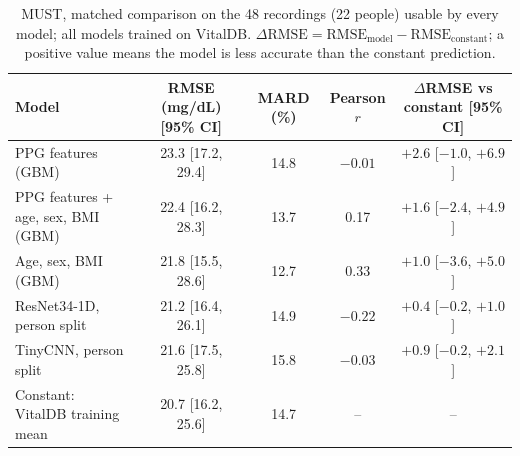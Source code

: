 \documentclass[10pt]{article}
\newcommand{\mgdl}{mg/dL}
\begin{document}
\begin{table}[H]
\centering\footnotesize\setlength{\tabcolsep}{3.5pt}
\caption{MUST, matched comparison on the 48 recordings (22 people) usable by every model; all models trained on VitalDB. $\Delta\mathrm{RMSE}=\mathrm{RMSE}_{\mathrm{model}}-\mathrm{RMSE}_{\mathrm{constant}}$; a positive value means the model is less accurate than the constant prediction.}
\label{tab:must_matched}
\begin{tabular}{@{}lcccc@{}}
\toprule
Model & RMSE (\mgdl{}) [95\% CI] & MARD (\%) & Pearson $r$ & $\Delta$RMSE vs constant [95\% CI] \\
\midrule
PPG features (GBM) & 23.3 [17.2, 29.4] & 14.8 & $-0.01$ & $+2.6$ [$-1.0$, $+6.9$] \\
PPG features + age, sex, BMI (GBM) & 22.4 [16.2, 28.3] & 13.7 & 0.17 & $+1.6$ [$-2.4$, $+4.9$] \\
Age, sex, BMI (GBM) & 21.8 [15.5, 28.6] & 12.7 & 0.33 & $+1.0$ [$-3.6$, $+5.0$] \\
ResNet34-1D, person split & 21.2 [16.4, 26.1] & 14.9 & $-0.22$ & $+0.4$ [$-0.2$, $+1.0$] \\
TinyCNN, person split & 21.6 [17.5, 25.8] & 15.8 & $-0.03$ & $+0.9$ [$-0.2$, $+2.1$] \\
Constant: VitalDB training mean & 20.7 [16.2, 25.6] & 14.7 & -- & -- \\
\bottomrule
\end{tabular}
\end{table}
\end{document}
